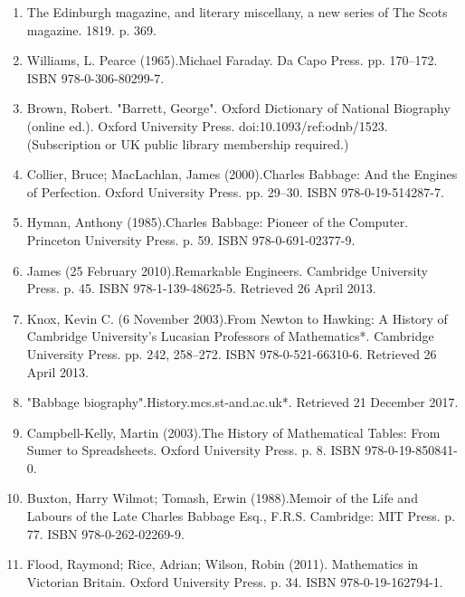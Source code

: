 \begin{enumerate}
\item The Edinburgh magazine, and literary miscellany, a new series of The Scots magazine. 1819. p. 369.
\item Williams, L. Pearce (1965).Michael Faraday. Da Capo Press. pp. 170–172. ISBN 978-0-306-80299-7.
\item Brown, Robert. "Barrett, George". Oxford Dictionary of National Biography (online ed.). Oxford University Press. doi:10.1093/ref:odnb/1523. (Subscription or UK public library membership required.)
\item Collier, Bruce; MacLachlan, James (2000).Charles Babbage: And the Engines of Perfection. Oxford University Press. pp. 29–30. ISBN 978-0-19-514287-7.
\item Hyman, Anthony (1985).Charles Babbage: Pioneer of the Computer. Princeton University Press. p. 59. ISBN 978-0-691-02377-9.
\item James (25 February 2010).Remarkable Engineers. Cambridge University Press. p. 45. ISBN 978-1-139-48625-5. Retrieved 26 April 2013.
\item Knox, Kevin C. (6 November 2003).From Newton to Hawking: A History of Cambridge University's Lucasian Professors of Mathematics*. Cambridge University Press. pp. 242, 258–272. ISBN 978-0-521-66310-6. Retrieved 26 April 2013.
\item "Babbage biography".History.mcs.st-and.ac.uk*. Retrieved 21 December 2017.
\item Campbell-Kelly, Martin (2003).The History of Mathematical Tables: From Sumer to Spreadsheets. Oxford University Press. p. 8. ISBN 978-0-19-850841-0.
\item Buxton, Harry Wilmot; Tomash, Erwin (1988).Memoir of the Life and Labours of the Late Charles Babbage Esq., F.R.S. Cambridge: MIT Press. p. 77. ISBN 978-0-262-02269-9.
\item Flood, Raymond; Rice, Adrian; Wilson, Robin (2011). Mathematics in Victorian Britain. Oxford University Press. p. 34. ISBN 978-0-19-162794-1.
\end{enumerate}